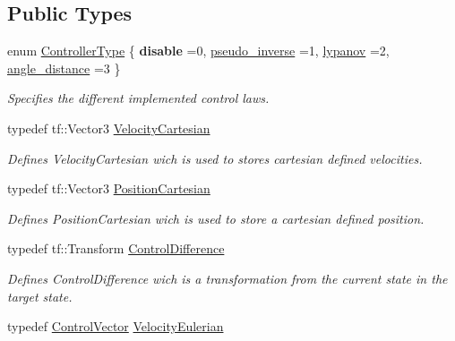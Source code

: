 \subsection*{Public Types}
\begin{DoxyCompactItemize}
\item 
enum \hyperlink{classController_aa6d956c4c220461a4152415ffa78690a}{Controller\+Type} \{ {\bfseries disable} =0, 
\hyperlink{classController_aa6d956c4c220461a4152415ffa78690aad2e9073ef821965020410686a3c89483}{pseudo\+\_\+inverse} =1, 
\hyperlink{classController_aa6d956c4c220461a4152415ffa78690aaed0e850e561d54619d85f32c37f5bfab}{lypanov} =2, 
\hyperlink{classController_aa6d956c4c220461a4152415ffa78690aa7ab0ee34114a951d4491d6eb73500cdc}{angle\+\_\+distance} =3
 \}\begin{DoxyCompactList}\small\item\em Specifies the different implemented control laws. \end{DoxyCompactList}
\item 
typedef tf\+::\+Vector3 \hyperlink{classController_a7ab3d947ee649f6bac652de6a00e8148}{Velocity\+Cartesian}\hypertarget{classController_a7ab3d947ee649f6bac652de6a00e8148}{}\label{classController_a7ab3d947ee649f6bac652de6a00e8148}

\begin{DoxyCompactList}\small\item\em Defines Velocity\+Cartesian wich is used to stores cartesian defined velocities. \end{DoxyCompactList}\item 
typedef tf\+::\+Vector3 \hyperlink{classController_a1b8b4035525237f0112b81d44a23da2c}{Position\+Cartesian}\hypertarget{classController_a1b8b4035525237f0112b81d44a23da2c}{}\label{classController_a1b8b4035525237f0112b81d44a23da2c}

\begin{DoxyCompactList}\small\item\em Defines Position\+Cartesian wich is used to store a cartesian defined position. \end{DoxyCompactList}\item 
typedef tf\+::\+Transform \hyperlink{classController_a75a1e2f93842f65d1263f7d3c2fd8898}{Control\+Difference}\hypertarget{classController_a75a1e2f93842f65d1263f7d3c2fd8898}{}\label{classController_a75a1e2f93842f65d1263f7d3c2fd8898}

\begin{DoxyCompactList}\small\item\em Defines Control\+Difference wich is a transformation from the current state in the target state. \end{DoxyCompactList}\item 
typedef \hyperlink{structController_1_1ControlVector}{Control\+Vector} \hyperlink{classController_a6849bee332c04d67ac6f3052cccd2669}{Velocity\+Eulerian}\hypertarget{classController_a6849bee332c04d67ac6f3052cccd2669}{}\label{classController_a6849bee332c04d67ac6f3052cccd2669}


\end{DoxyCompactItemize}
